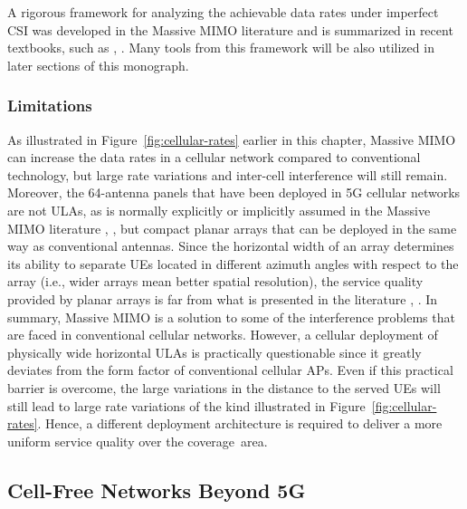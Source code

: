 A rigorous framework for analyzing the achievable data rates under imperfect \gls{CSI} was developed in the Massive \gls{MIMO} literature and is summarized in recent textbooks, such as \cite{massivemimobook}, \cite{Marzetta2016a}. Many tools from this framework will be also utilized in later sections of this monograph.

\subsubsection{Limitations}

As illustrated in Figure~\ref{fig:cellular-rates} earlier in this chapter, Massive \gls{MIMO} can increase the data rates in a cellular network compared to conventional technology, but large rate variations and inter-cell interference will still remain. Moreover, the 64-antenna panels that have been deployed in 5G cellular networks are not \glspl{ULA}, as is normally explicitly or implicitly assumed in the Massive \gls{MIMO} literature \cite{massivemimobook}, \cite{Marzetta2016a}, but compact planar arrays that can be deployed in the same way as conventional antennas. 
Since the horizontal width of an array determines its ability to separate \glspl{UE} located in different azimuth angles with respect to the array (i.e., wider arrays mean better spatial resolution), the service quality provided by planar arrays is far from what is presented in the literature \cite{Aslam2019a}, \cite{Bjornson2019d}.
In summary, Massive \gls{MIMO} is a solution to some of the interference problems that are faced in conventional cellular networks. However, a cellular deployment of physically wide horizontal  \glspl{ULA} is practically questionable since it greatly deviates from the form factor of conventional cellular \glspl{AP}. Even if this practical barrier is overcome, the large variations in the distance to the served \glspl{UE} will still lead to large rate variations of the kind illustrated in Figure~\ref{fig:cellular-rates}. Hence, a different deployment architecture is required to deliver a more uniform service quality over the coverage~area.


\subsection{Cell-Free Networks Beyond 5G}
\label{subsec-history-cellfree}

